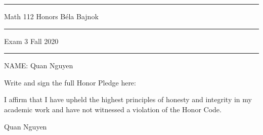 \documentclass[12pt]{article}
\begin{document}
\hrule
\vspace{.2cm}

{\Large \noindent Math 112 Honors
\hfill
B\'ela Bajnok}

\vspace{.3cm}
\hrule

{\Large \noindent 
Exam 3
\hfill
Fall 2020}

\vspace{.3cm}
\hrule

\noindent NAME:  Quan Nguyen

\noindent \hrulefill\rule{0pt}{4pt}

\noindent Write and sign the full Honor Pledge here:

\vspace{2mm}

I affirm that I have upheld the highest principles of honesty and integrity in my academic work and have not witnessed a violation of the Honor Code. \par

Quan Nguyen

\vspace{8mm}

\noindent \hrulefill\rule{0pt}{4pt}

\end{document}
